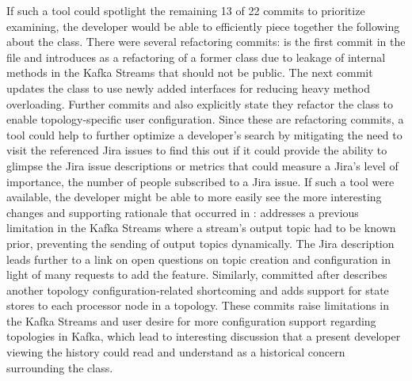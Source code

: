 If such a tool could spotlight the remaining 13 of 22 commits to prioritize examining, the developer would be able to efficiently piece together the following about the  class. 
There were several refactoring commits:  is the first commit in the file and introduces  as a refactoring of a former class due to leakage of internal methods in the Kafka Streams  that should not be public. 
The next commit  updates the  class to use newly added interfaces for reducing heavy method overloading.
Further commits  and  also explicitly state they refactor the  class to enable topology-specific user configuration.
Since these are refactoring commits, a tool could help to further optimize a developer's search by mitigating the need to visit the referenced Jira issues to find this out if it could provide the ability to glimpse the Jira issue descriptions or metrics that could measure a Jira's level of importance, \eg the number of people subscribed to a Jira issue.
If such a tool were available, the developer might be able to more easily see the more interesting changes and supporting rationale that occurred in :
 addresses a previous limitation in the Kafka Streams  where a stream's output topic had to be known prior, preventing the sending of output topics dynamically. 
The Jira description leads further to a link on open questions on topic creation and configuration in light of many requests to add the feature.
Similarly,  committed after describes another topology configuration-related shortcoming and adds support for state stores to each processor node in a topology.
These commits raise limitations in the Kafka Streams  and user desire for more configuration support regarding topologies in Kafka, which lead to interesting discussion that a present developer viewing the history could read and understand as a historical concern surrounding the  class.

